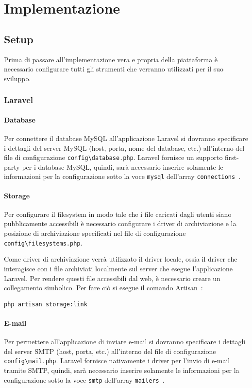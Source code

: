\chapter{Implementazione}\label{cap:implementazione}
\section{Setup}
Prima di passare all'implementazione vera e propria della piattaforma \`e necessario configurare tutti gli strumenti che verranno utilizzati per il suo sviluppo.
\subsection{Laravel}
\subsubsection{Database}
Per connettere il database MySQL all'applicazione Laravel si dovranno specificare i dettagli del server MySQL (host, porta, nome del database, etc.) all'interno del file di configurazione \verb|config\database.php|. Laravel fornisce un supporto first-party per i database MySQL, quindi, sar\`a  necessario inserire solamente le informazioni per la configurazione sotto la voce \verb|mysql| dell'array \verb|connections|~\cite{LaravelDBConfig}. 
\subsubsection{Storage}
Per configurare il filesystem in modo tale che i file caricati dagli utenti siano pubblicamente accessibili \`e necessario configurare i driver di archiviazione e la posizione di archiviazione specificati nel file di configurazione \sloppy\verb|config\filesystems.php|.

Come driver di archiviazione verr\`a utilizzato il driver locale, ossia il driver che interagisce con i file archiviati localmente sul server che esegue l'applicazione Laravel. Per rendere questi file accessibili dal web, \`e necessario creare un collegamento simbolico. Per fare ci\`o si esegue il comando Artisan~\cite{LaravelFilesystemConfig}:
\begin{lstlisting}[basicstyle=\linespread{1.4}\ttfamily\fontsize{11pt}{11pt}\selectfont]
php artisan storage:link
\end{lstlisting}
\subsubsection{E-mail}
Per permettere all'applicazione di inviare e-mail si dovranno specificare i dettagli del server SMTP (host, porta, etc.) all'interno del file di configurazione \verb|config\mail.php|. Laravel fornisce nativamente i driver per l'invio di e-mail tramite SMTP, quindi, sar\`a  necessario inserire solamente le informazioni per la configurazione sotto la voce \verb|smtp| dell'array \verb|mailers|~\cite{LaravelEmailConfig}. 

